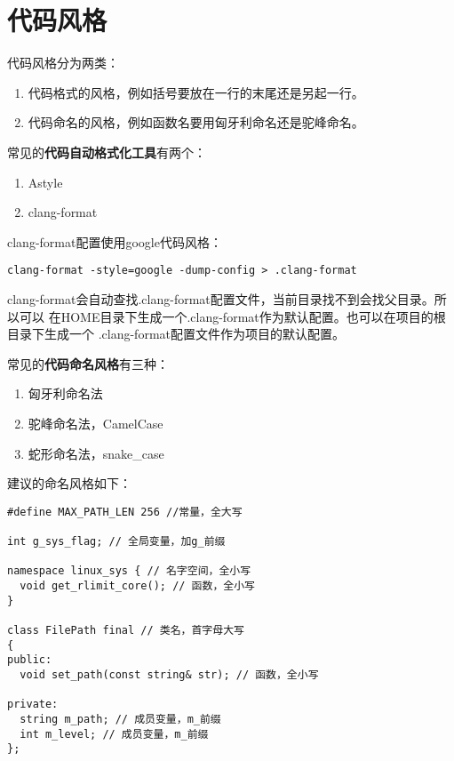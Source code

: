 \chapter{代码风格}

代码风格分为两类：

\begin{enumerate}
  \item 代码格式的风格，例如括号要放在一行的末尾还是另起一行。
  \item 代码命名的风格，例如函数名要用匈牙利命名还是驼峰命名。
\end{enumerate}

常见的\textbf{代码自动格式化工具}有两个：

\begin{enumerate}
  \item Astyle
  \item clang-format
\end{enumerate}

clang-format配置使用google代码风格：

\begin{verbatim}
clang-format -style=google -dump-config > .clang-format
\end{verbatim}

clang-format会自动查找.clang-format配置文件，当前目录找不到会找父目录。所以可以
在HOME目录下生成一个.clang-format作为默认配置。也可以在项目的根目录下生成一个
.clang-format配置文件作为项目的默认配置。

常见的\textbf{代码命名风格}有三种：

\begin{enumerate}
  \item 匈牙利命名法
  \item 驼峰命名法，CamelCase
  \item 蛇形命名法，snake\_case
\end{enumerate}

建议的命名风格如下：

\begin{verbatim}
#define MAX_PATH_LEN 256 //常量，全大写

int g_sys_flag; // 全局变量，加g_前缀

namespace linux_sys { // 名字空间，全小写
  void get_rlimit_core(); // 函数，全小写
}

class FilePath final // 类名，首字母大写
{
public:
  void set_path(const string& str); // 函数，全小写

private:
  string m_path; // 成员变量，m_前缀
  int m_level; // 成员变量，m_前缀
};
\end{verbatim}
